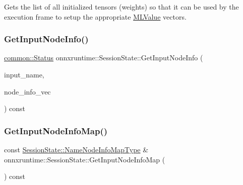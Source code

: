 Gets the list of all initialized tensors (weights) so that it can be used by the execution frame to setup the appropriate \mbox{\hyperlink{classonnxruntime_1_1MLValue}{M\+L\+Value}} vectors. \mbox{\label{classonnxruntime_1_1SessionState_a6764e725a348073622544a4b98332078}} 
\subsubsection{\texorpdfstring{Get\+Input\+Node\+Info()}{GetInputNodeInfo()}}
{\footnotesize\ttfamily \mbox{\hyperlink{classonnxruntime_1_1common_1_1Status}{common\+::\+Status}} onnxruntime\+::\+Session\+State\+::\+Get\+Input\+Node\+Info (\begin{DoxyParamCaption}\item[{const std\+::string \&}]{input\+\_\+name,  }\item[{std\+::vector$<$ \mbox{\hyperlink{structonnxruntime_1_1SessionState_1_1NodeInfo}{Node\+Info}} $>$ \&}]{node\+\_\+info\+\_\+vec }\end{DoxyParamCaption}) const}

\mbox{\label{classonnxruntime_1_1SessionState_a09f916e75db7903d8a0da8d6a78acc50}} 
\subsubsection{\texorpdfstring{Get\+Input\+Node\+Info\+Map()}{GetInputNodeInfoMap()}}
{\footnotesize\ttfamily const \mbox{\hyperlink{classonnxruntime_1_1SessionState_ae235b8dfb073b021d014a42b5dcc0072}{Session\+State\+::\+Name\+Node\+Info\+Map\+Type}} \& onnxruntime\+::\+Session\+State\+::\+Get\+Input\+Node\+Info\+Map (\begin{DoxyParamCaption}{ }\end{DoxyParamCaption}) const}

\mbox{\label{classonnxruntime_1_1SessionState_a55c1f861930fdd86c669b86a687188aa}} 
